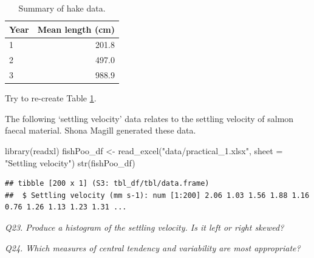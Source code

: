 \documentclass[
  11pt,
  a4paper,
]{book}
\newenvironment{Shaded}{\begin{snugshade}}{\end{snugshade}}
\newcommand{\AttributeTok}[1]{\textcolor[rgb]{0.77,0.63,0.00}{#1}}
\newcommand{\CommentTok}[1]{\textcolor[rgb]{0.56,0.35,0.01}{\textit{#1}}}
\newcommand{\FunctionTok}[1]{\textcolor[rgb]{0.00,0.00,0.00}{#1}}
\newcommand{\NormalTok}[1]{#1}
\newcommand{\OtherTok}[1]{\textcolor[rgb]{0.56,0.35,0.01}{#1}}
\newcommand{\SpecialCharTok}[1]{\textcolor[rgb]{0.00,0.00,0.00}{#1}}
\newcommand{\StringTok}[1]{\textcolor[rgb]{0.31,0.60,0.02}{#1}}
\begin{document}
\begin{Shaded}
\end{Shaded}

\begin{table}

\caption{\label{tab:hake-table}Summary of hake data.}
\centering
\begin{tabular}[t]{lr}
\toprule
Year & Mean length (cm)\\
\midrule
1 & 201.8\\
2 & 497.0\\
3 & 988.9\\
\bottomrule
\end{tabular}
\end{table}

Try to re-create Table \ref{tab:hake-table}.

The following `settling velocity' data relates to the settling velocity of salmon faecal material. Shona Magill generated these data.

\begin{Shaded}
\begin{Highlighting}[]
\FunctionTok{library}\NormalTok{(readxl)}
\NormalTok{fishPoo\_df }\OtherTok{\textless{}{-}} \FunctionTok{read\_excel}\NormalTok{(}\StringTok{"data/practical\_1.xlsx"}\NormalTok{, }\AttributeTok{sheet =} \StringTok{"Settling velocity"}\NormalTok{)}
\FunctionTok{str}\NormalTok{(fishPoo\_df)}
\end{Highlighting}
\end{Shaded}

\begin{verbatim}
## tibble [200 x 1] (S3: tbl_df/tbl/data.frame)
##  $ Settling velocity (mm s-1): num [1:200] 2.06 1.03 1.56 1.88 1.16 0.76 1.26 1.13 1.23 1.31 ...
\end{verbatim}

\emph{Q23. Produce a histogram of the settling velocity. Is it left or right skewed?}

\emph{Q24. Which measures of central tendency and variability are most appropriate?}
\end{document}
